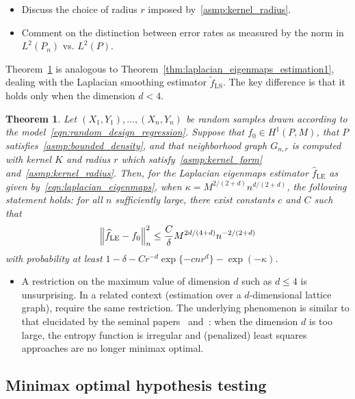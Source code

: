 \documentclass{article}
\newcommand{\1}{\mathbf{1}}
\newcommand{\wt}[1]{\widetilde{#1}}
\newcommand{\wh}[1]{\widehat{#1}}
\newcommand{\LE}{\mathrm{LE}}
\newcommand{\LS}{\mathrm{LS}}
\theoremstyle{alden}
\theoremstyle{aldenthm}
\newtheorem{theorem}{Theorem}
\theoremstyle{definition}
\theoremstyle{remark}
\begin{document}
\begin{itemize}
	\item Discuss the choice of radius $r$ imposed by~\ref{asmp:kernel_radius}.
	\item Comment on the distinction between error rates as measured by the norm in $L^2(P_n)$ vs. $L^2(P)$. 
\end{itemize}

Theorem~\ref{thm:laplacian_smoothing_estimation1} is analogous to Theorem~\ref{thm:laplacian_eigenmaps_estimation1}, dealing with the Laplacian smoothing estimator $\wt{f}_{\LS}$. The key difference is that it holds only when the dimension $d < 4$.  
\begin{theorem}
	\label{thm:laplacian_smoothing_estimation1}
	Let $(X_1,Y_1),\ldots,(X_n,Y_n)$ be random samples drawn according to the model~\eqref{eqn:random_design_regression}. Suppose that $f_0 \in H^1(P,M)$, that $P$ satisfies~\ref{asmp:bounded_density}, and that neighborhood graph $G_{n,r}$ is computed with kernel $K$ and radius $r$ which satisfy~\ref{asmp:kernel_form} and~\ref{asmp:kernel_radius}. Then, for the Laplacian eigenmaps estimator $\wh{f}_{\LE}$ as given by~\eqref{eqn:laplacian_eigenmaps}, when $\kappa = M^{2/(2 + d)}n^{d/(2 + d)}$, the following statement holds: for all $n$ sufficiently large, there exist constants $c$ and $C$ such that
	\begin{equation*}
	\Bigl\|\wh{f}_{\LE} - f_0\Bigr\|_n^2 \leq \frac{C}{\delta} M^{2d/(4 + d)} n^{-2/(2 + d)}
	\end{equation*}
	with probability at least $1 - \delta -  Cr^{-d}\exp\{-cnr^d\} - \exp(-\kappa)$.
\end{theorem}

\begin{itemize}
	\item A restriction on the maximum value of dimension $d$ such as $d \leq 4$ is unsurprising. In a related context (estimation over a $d$-dimensional lattice graph), \cite{sadhanala2016} require the same restriction. The underlying phenomenon is similar to that elucidated by the seminal papers~\cite{birge1993} and~\cite{birge1998}: when the dimension $d$ is too large, the entropy function is irregular and (penalized) least squares approaches are no longer minimax optimal.
\end{itemize}

\subsection{Minimax optimal hypothesis testing}
\end{document}

